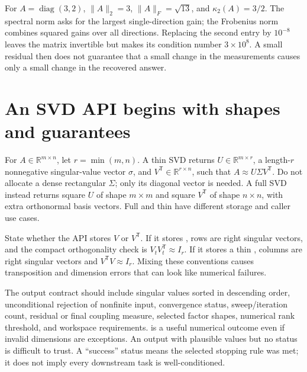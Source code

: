 For \(A=\operatorname{diag}(3,2)\), \(\|A\|_2=3\), \(\|A\|_F=\sqrt{13}\), and \(\kappa_2(A)=3/2\). The spectral norm asks for the largest single-direction gain; the Frobenius norm combines squared gains over all directions. Replacing the second entry by \(10^{-8}\) leaves the matrix invertible but makes its condition number \(3\times10^8\). A small residual then does not guarantee that a small change in the measurements causes only a small change in the recovered answer.

\section{An SVD API begins with shapes and guarantees}\label{02-foundations-ii-ch038-an-svd-api-begins-with-shapes-and-guarantees}

\hypertarget{02-foundations-ii-ch038-an-svd-api-begins-with-shapes-and-guarantees}{}

For \(A\in\mathbb R^{m\times n}\), let \(r=\min(m,n)\). A thin SVD returns \(U\in\mathbb R^{m\times r}\), a length-\(r\) nonnegative singular-value vector \(\sigma\), and \(V^\mathsf T\in\mathbb R^{r\times n}\), such that \(A\approx U\Sigma V^\mathsf T\). Do not allocate a dense rectangular \(\Sigma\); only its diagonal vector is needed. A full SVD instead returns square \(U\) of shape \(m\times m\) and square \(V^\mathsf T\) of shape \(n\times n\), with extra orthonormal basis vectors. Full and thin have different storage and caller use cases.

State whether the API stores \(V\) or \(V^\mathsf T\). If it stores , rows are right singular vectors, and the compact orthogonality check is \(V_tV_t^\mathsf T\approx I_r\). If it stores a thin , columns are right singular vectors and \(V^\mathsf TV\approx I_r\). Mixing these conventions causes transposition and dimension errors that can look like numerical failures.

The output contract should include singular values sorted in descending order, unconditional rejection of nonfinite input, convergence status, sweep/iteration count, residual or final coupling measure, selected factor shapes, numerical rank threshold, and workspace requirements.  is a useful numerical outcome even if invalid dimensions are exceptions. An output with plausible values but no status is difficult to trust. A ``success'' status means the selected stopping rule was met; it does not imply every downstream task is well-conditioned.

